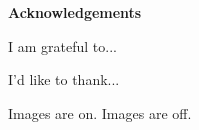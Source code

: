 \thispagestyle{empty}

\begin{center}
    {\LARGE\bf Acknowledgements}
\end{center}

I am grateful to...

I'd like to thank...

\ifimages Images are on. \else Images are off. \fi